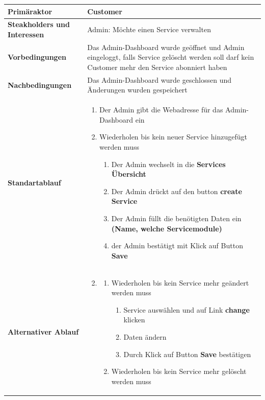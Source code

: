 \documentclass[11pt]{scrartcl}
\begin{document}
\begin{longtabu} to \textwidth {X[1,l] X[2,l]}
	\bfseries Primäraktor & Customer  \\\hline 
	\bfseries Steakholders und Interessen & Admin: Möchte einen Service verwalten  \\\hline 
	\bfseries Vorbedingungen & Das Admin-Dashboard wurde geöffnet und Admin eingeloggt, 
	falls Service gelöscht werden soll darf kein Customer mehr den Service abonniert haben\\\hline 
	\bfseries Nachbedingungen & Das Admin-Dashboard wurde geschlossen und Änderungen 
	wurden gespeichert  \\\hline 
	\bfseries Standartablauf & 
		\begin{enumerate}
			\item Der Admin gibt die Webadresse für das Admin-Dashboard ein
			\item Wiederholen bis kein neuer Service hinzugefügt werden muss
			\begin{enumerate}
			  \item Der Admin wechselt in die \textbf{Services Übersicht}
			  \item Der Admin drückt auf den button \textbf{create Service}
			  \item Der Admin füllt die benötigten Daten ein \textbf{(Name, welche Servicemodule)}
			  \item der Admin bestätigt mit Klick auf Button \textbf{Save}
			\end{enumerate}
		\end{enumerate}
      \\\hline
      \bfseries Alternativer Ablauf & 
      \begin{enumerate}
        \setcounter{enumi}{1}
        \item 
        \begin{enumerate}
          \item Wiederholen bis kein Service mehr geändert werden muss
            \begin{enumerate}
              \item Service auswählen und auf Link \textbf{change} klicken
              \item Daten ändern
              \item Durch Klick auf Button \textbf{Save} bestätigen
            \end{enumerate}
            \item Wiederholen bis kein Service mehr gelöscht werden muss
            \begin{enumerate}

\end{enumerate}
\end{enumerate}
\end{enumerate}
\end{longtabu}
\end{document}

